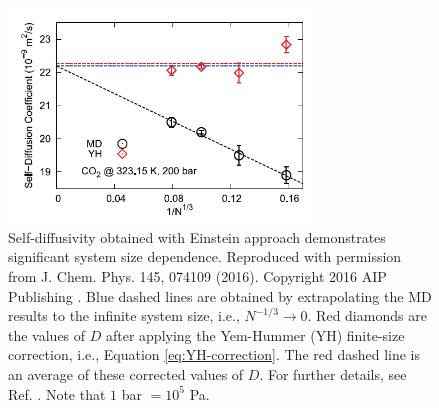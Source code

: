 \documentclass[9pt,bestpractices]{livecoms}
\begin{document}
\begin{figure}[htb!]
	\centering
	\includegraphics[width=3.2in]{MoultosFig1.png}
	\caption{Self-diffusivity obtained with Einstein approach demonstrates significant system size dependence. Reproduced with permission from J. Chem. Phys. 145, 074109 (2016). Copyright 2016 AIP Publishing \cite{Moultos2016}. Blue dashed lines are obtained by extrapolating the MD results to the infinite system size, i.e., $N^{-1/3} \to 0$. Red diamonds are the values of $D$ after applying the Yem-Hummer (YH) finite-size correction, i.e., Equation \ref{eq:YH-correction}. The red dashed line is an average of these corrected values of $D$. For further details, see Ref. \cite{Moultos2016}. Note that $1$ bar $ = 10^5$ Pa.}
	\label{fig:MoultosFig1}
\end{figure}



%
\end{document}
